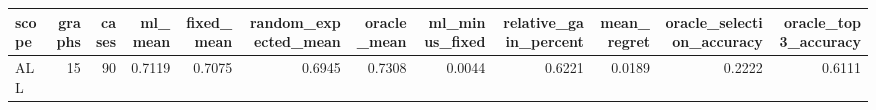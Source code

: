 \begin{tabular}{lrrrrrrrrrrr}
\toprule
scope & graphs & cases & ml_mean & fixed_mean & random_expected_mean & oracle_mean & ml_minus_fixed & relative_gain_percent & mean_regret & oracle_selection_accuracy & oracle_top3_accuracy \\
\midrule
ALL & 15 & 90 & 0.7119 & 0.7075 & 0.6945 & 0.7308 & 0.0044 & 0.6221 & 0.0189 & 0.2222 & 0.6111 \\
\bottomrule
\end{tabular}
